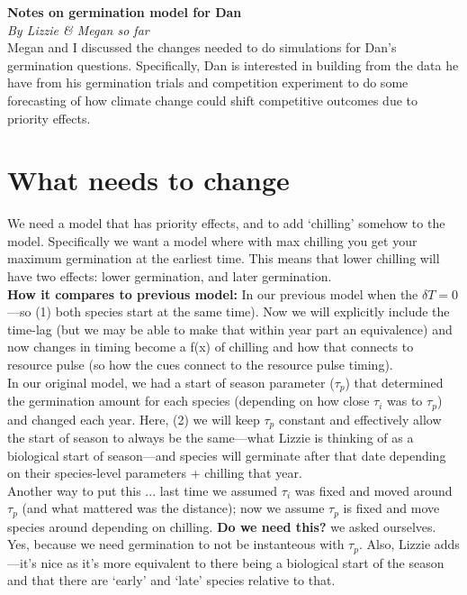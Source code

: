 \documentclass[11pt,letter]{article}
\begin{document}

\renewcommand{\refname}{\CHead{}}


{\bf Notes on germination model for Dan}\\
\emph{By Lizzie \& Megan so far}\\

Megan and I discussed the changes needed to do simulations for Dan's germination questions. Specifically, Dan is interested in building from the data he have from his germination trials and competition experiment to do some forecasting of how climate change could shift competitive outcomes due to priority effects.\\

\section{What needs to change}

We need a model that has priority effects, and to add `chilling' somehow to the model. Specifically we want a model where with max chilling you get your maximum germination at the earliest time. This means that lower chilling will have two effects: lower germination, and later germination. \\

{\bf How it compares to previous model:} 
In our previous model when the $\delta T = 0$---so (1) both species start at the same time). Now we will explicitly include the time-lag (but we may be able to make that within year part an equivalence) and now changes in timing become a f(x) of chilling and how that connects to resource pulse (so how the cues connect to the resource pulse timing).\\

In our original model, we had a start of season parameter ($\tau_p$) that determined the germination amount for each species (depending on how close $\tau_i$ was to $\tau_p$) and changed each year. Here, (2) we will keep $\tau_p$ constant and effectively allow the start of season to always be the same---what Lizzie is thinking of as a biological start of season---and species will germinate after that date depending on their species-level parameters + chilling that year. \\

Another way to put this ... last time we assumed $\tau_i$ was fixed and moved around $\tau_p$ (and what mattered was the distance); now we assume $\tau_p$ is fixed and move species around depending on chilling. {\bf Do we need this?} we asked ourselves. Yes, because we need germination to not be instanteous with $\tau_p$. Also, Lizzie adds---it's nice as it's more equivalent to there being a biological start of the season and that there are `early' and `late' species relative to that.
\end{document}
